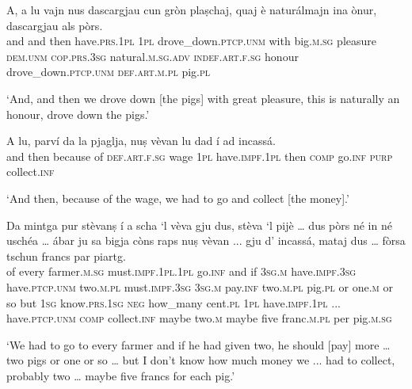 \begin{linenumbers}
	\gll    A, a lu vajn nus dascargjau cun gròn plaṣchaj, quaj è naturálmajn ina ònur, dascargjau als pòrs.\\
	and and then have.\textsc{prs.1pl} \textsc{1pl} drove\_down.\textsc{ptcp.unm} with  big.\textsc{m.sg} pleasure  \textsc{dem.unm} \textsc{cop.prs.3sg} natural.\textsc{m.sg.adv}  \textsc{indef.art.f.sg} honour drove\_down.\textsc{ptcp.unm} \textsc{def.art.m.pl}  pig.\textsc{pl}  \textsc{}  \textsc{}  \textsc{}  \textsc{}  \textsc{} \\
\end{linenumbers}
\medskip
\glt `And, and then we drove down [the pigs] with great pleasure, this is naturally an honour, drove down the pigs.'
\medskip

\begin{linenumbers}
\gll    A lu, parví da la pjaglja, nuṣ vèvan lu dad í ad incassá.\\
and then because of \textsc{def.art.f.sg} wage \textsc{1pl} have.\textsc{impf.1pl} then \textsc{comp} go.\textsc{inf}  \textsc{purp}  collect.\textsc{inf} \\
\end{linenumbers}
\medskip
\glt `And then, because of the wage, we had to go and collect [the money].'
\medskip

\begin{linenumbers}
	\gll    Da mintga pur stèvanṣ í a scha `l vèva gju dus, stèva `l pijè …  dus pòrs né in né uschéa … ábar ju sa bigja còns raps nuṣ vèvan\footnotemark{} ... gju d’ incassá, mataj dus … fòrsa tschun francs par piartg.\\
	of every farmer.\textsc{m.sg} must.\textsc{impf.1pl.1pl} go.\textsc{inf} and if \textsc{3sg.m} have.\textsc{impf.3sg} have.\textsc{ptcp.unm} two.\textsc{m.pl} must.\textsc{impf.3sg}  \textsc{3sg.m} pay.\textsc{inf} {} two.\textsc{m.pl} pig.\textsc{pl} or one.\textsc{m} or so {} but  \textsc{1sg}  know.\textsc{prs.1sg}  \textsc{neg} how\_many cent.\textsc{pl} \textsc{1pl} have.\textsc{impf.1pl} ... have.\textsc{ptcp.unm} \textsc{comp} collect.\textsc{inf} maybe two.\textsc{m} {} maybe five franc.\textsc{m.pl} per pig.\textsc{m.sg}\\
\end{linenumbers}
\medskip
\glt `We had to go to every farmer and if he had given two, he should [pay] more … two pigs or one or so … but I don’t know how much money we ... had to collect, probably two … maybe five francs for each pig.'
\medskip

